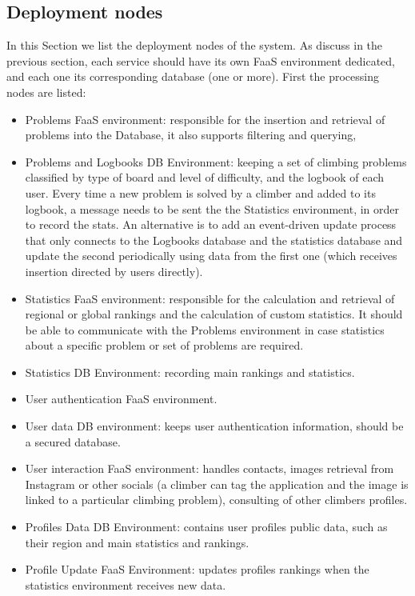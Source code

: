 \documentclass{article}
\begin{document}
\subsection{Deployment nodes}
In this Section we list the deployment nodes of the system. As discuss in the previous section, each service should have its own FaaS environment dedicated, and each one its corresponding database (one or more).
First the processing nodes are listed:
\begin{itemize}
    \item Problems FaaS environment: responsible for the insertion and retrieval of problems into the Database, it also supports filtering and querying,
    \item Problems and Logbooks DB Environment: keeping a set of climbing problems classified by type of board and level of difficulty, and the logbook of each user. Every time a new problem is solved by a climber and added to its logbook, a message needs to be sent the the Statistics environment, in order to record the stats. An alternative is to add an event-driven update process that only connects to the Logbooks database and the statistics database and update the second periodically using data from the first one (which receives insertion directed by users directly).
    \item Statistics FaaS environment: responsible for the calculation and retrieval of regional or global rankings and the calculation of custom statistics. It should be able to communicate with the Problems environment in case statistics about a specific problem or set of problems are required.
    \item Statistics DB Environment: recording main rankings and statistics.
    \item User authentication FaaS environment.
    \item User data DB environment: keeps user authentication information, should be a secured database.
    \item User interaction FaaS environment: handles contacts, images retrieval	from Instagram or other socials (a climber can tag the application and the image is linked to a particular climbing problem), consulting of other climbers profiles.
    \item Profiles Data DB Environment: contains user profiles public data, such as their region and main statistics and rankings.
    \item Profile Update FaaS Environment: updates profiles rankings when the statistics environment receives new data.  
\end{itemize}
\end{document}

